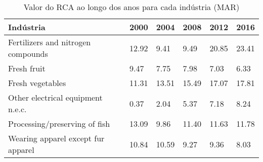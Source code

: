 \begin{table}
\centering
\caption{Valor do RCA ao longo dos anos para cada indústria (MAR)}
\label{tab:ex3-tempo-MAR}
\begin{tabular}{p{6cm}p{1.5cm}p{1.5cm}p{1.5cm}p{1.5cm}p{1.5cm}}
\toprule
                         Indústria &  2000 &  2004 &  2008 &  2012 &  2016 \\
\midrule
Fertilizers and nitrogen compounds & 12.92 &  9.41 &  9.49 & 20.85 & 23.41 \\
                       Fresh fruit &  9.47 &  7.75 &  7.98 &  7.03 &  6.33 \\
                  Fresh vegetables & 11.31 & 13.51 & 15.49 & 17.07 & 17.81 \\
 Other electrical equipment n.e.c. &  0.37 &  2.04 &  5.37 &  7.18 &  8.24 \\
     Processing/preserving of fish & 13.09 &  9.86 & 11.40 & 11.63 & 11.78 \\
Wearing apparel except fur apparel & 10.84 & 10.59 &  9.27 &  9.36 &  8.03 \\
\bottomrule
\end{tabular}
\end{table}
